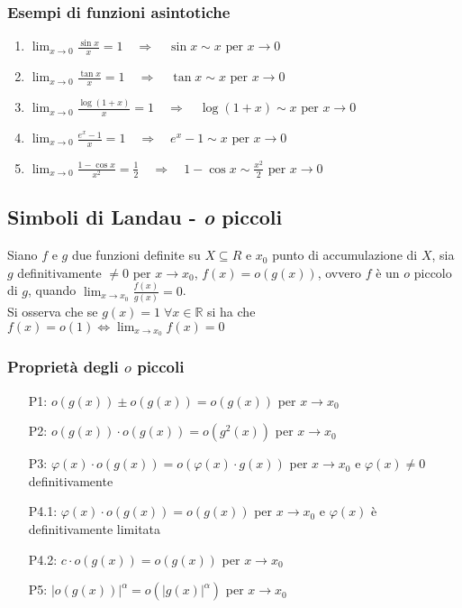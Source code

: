\documentclass[a4paper]{article}
\begin{document}
\subsubsection*{Esempi di funzioni asintotiche}
\begin{enumerate}
	\item \(\displaystyle \lim_{x \to 0} \frac{\sin x}{x} = 1 \quad \Rightarrow \quad \sin x \sim x \text{ per } x \to 0\)
	\item \(\displaystyle \lim_{x \to 0} \frac{\tan x}{x} = 1 \quad \Rightarrow \quad \tan x \sim x \text{ per } x \to 0\)
	\item \(\displaystyle \lim_{x \to 0} \frac{\log (1 + x)}{x} = 1 \quad \Rightarrow \quad \log (1 + x) \sim x \text{ per } x \to 0\)
	\item \(\displaystyle \lim_{x \to 0} \frac{e ^ x - 1}{x} = 1 \quad \Rightarrow \quad e ^ x - 1 \sim x \text{ per } x \to 0\)
	\item \(\displaystyle \lim_{x \to 0} \frac{1 - \cos x}{x^2} = \frac{1}{2} \quad \Rightarrow \quad 1 - \cos x \sim \frac{x^2}{2} \text{ per } x \to 0\)
\end{enumerate}

\newpage

\subsection{Simboli di Landau - \textit{o} piccoli}
Siano \(f\) e \(g\) due funzioni definite su \(X \subseteq R\) e \(x_0\) punto di accumulazione di \(X\), sia \(g\) definitivamente \(\neq 0\) per \(x \to x_0\),
\(f(x) = o(g(x))\), ovvero \(f\) è un \(o\) piccolo di \(g\), quando \(\displaystyle \lim_{x \to x_0} \frac{f(x)}{g(x)} = 0\). \\
Si osserva che se \(g(x) = 1 \; \forall x \in \mathbb{R}\) si ha che \(f(x) = o(1) \Leftrightarrow \displaystyle \lim_{x \to x_0} f(x) = 0\)

\subsubsection*{Proprietà degli \(o\) piccoli}
\begin{itemize}
	\item[P1:] \(o(g(x)) \pm o(g(x)) = o(g(x))\) per \(x \to x_0\)
	\item[P2:] \(o(g(x)) \cdot o(g(x)) = o(g^2(x))\) per \(x \to x_0\)
	\item[P3:] \(\varphi(x) \cdot o(g(x)) = o(\varphi (x) \cdot g(x))\) per \(x \to x_0\) e \(\varphi(x) \neq 0\) definitivamente
	\item[P4.1:] \(\varphi(x) \cdot o(g(x)) = o(g(x))\) per \(x \to x_0\) e \(\varphi(x)\) è definitivamente limitata
	\item[P4.2:] \(c \cdot o(g(x)) = o(g(x))\) per \(x \to x_0\)
	\item[P5:] \(\left| o(g(x)) \right| ^ \alpha = o(\left| g(x) \right| ^ \alpha)\) per \(x \to x_0\)
\end{itemize}
\end{document}
